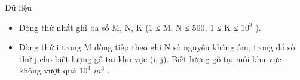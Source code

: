 Dữ liệu
\begin{itemize}
	\item Dòng thứ nhất ghi ba số M, N, K (1 ≤ M, N ≤ 500, 1 ≤ K ≤ $10^{9}$ ).
	\item Dòng thứ i trong M dòng tiếp theo ghi N số nguyên không âm, trong đó số thứ j cho biết lượng gỗ tại khu vực (i, j). Biết lượng gỗ tại mỗi khu vực không vượt quá $10^{4}$ $m^{3}$ .
\end{itemize}